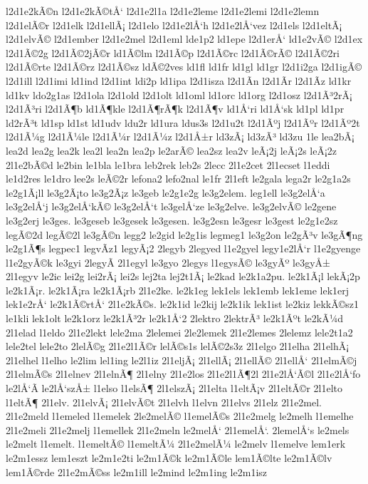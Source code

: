 {l2d1e2kÃ©n
l2d1e2kÃ©tÅ‘
l2d1e2l1a
l2d1e2leme
l2d1e2lemi
l2d1e2lemn
l2d1elÃ©r
l2d1elk
l2d1ellÃ¡
l2d1elo
l2d1e2lÅ‘h
l2d1e2lÅ‘vez
l2d1els
l2d1eltÃ¡
l2d1elvÃ©
l2d1ember
l2d1e2mel
l2d1eml
lde1p2
ld1epe
l2d1erÅ‘
ld1e2vÃ©
l2d1ex
l2d1Ã©2g
l2d1Ã©2jÃ©r
ld1Ã©lm
l2d1Ã©p
l2d1Ã©rc
l2d1Ã©rÃ©
l2d1Ã©2ri
l2d1Ã©rte
l2d1Ã©rz
l2d1Ã©sz
ldÃ©2ves
ld1fl
ld1fr
ld1gl
ld1gr
l2d1i2ga
l2d1igÃ©
l2d1ill
l2d1imi
ld1ind
l2d1int
ldi2p
ld1ipa
l2d1isza
l2d1Ã­n
l2d1Ã­r
l2d1Ã­z
ld1kr
ld1kv
ldo2g1as
l2d1ola
l2d1old
l2d1olt
ld1oml
ld1orc
ld1org
l2d1osz
l2d1Ã³2rÃ¡
l2d1Ã³ri
l2d1Ã¶b
ld1Ã¶kle
l2d1Ã¶rÃ¶k
l2d1Ã¶v
ld1Å‘ri
ld1Å‘sk
ld1pl
ld1pr
ld2rÃ³t
ld1sp
ld1st
ld1udv
ldu2r
ld1ura
ldus3s
l2d1u2t
l2d1Ãºj
l2d1Ãºr
l2d1Ãº2t
l2d1Ã¼g
l2d1Ã¼le
l2d1Ã¼r
l2d1Ã¼z
l2d1Å±r
ld3zÃ¡
ld3zÃ³
ld3zu
1le
lea2bÃ¡
lea2d
lea2g
lea2k
lea2l
lea2n
lea2p
le2arÃ©
lea2sz
lea2v
leÃ¡2j
leÃ¡2s
leÃ¡2z
2l1e2bÃ©d
le2bin
le1bla
le1bra
leb2rek
leb2s
2lecc
2l1e2cet
2l1ecset
l1eddi
le1d2res
le1dro
lee2s
leÃ©2r
lefona2
lefo2nal
le1fr
2l1eft
le2gala
lega2r
le2g1a2s
le2g1Ã¡ll
le3g2Ã¡to
le3g2Ã¡z
le3geb
le2g1e2g
le3g2elem.
leg1ell
le3g2elÅ‘a
le3g2elÅ‘j
le3g2elÅ‘kÃ©
le3g2elÅ‘t
le3gelÅ‘ze
le3g2elve.
le3g2elvÃ©
le2gene
le3g2erj
le3ges.
le3geseb
le3gesek
le3gesen.
le3g2esn
le3gesr
le3gest
le2g1e2sz
legÃ©2d
legÃ©2l
le3gÃ©n
legg2
le2gid
le2g1is
legmeg1
le3g2on
le2gÃ³v
le3gÃ¶ng
le2g1Ã¶s
legpec1
legvÃ­z1
legyÃ¡2
2legyb
2legyed
l1e2gyel
legy1e2lÅ‘r
l1e2gyenge
l1e2gyÃ©k
le3gyi
2legyÃ­
2l1egyl
le3gyo
2legys
l1egysÃ©
le3gyÃº
le3gyÅ±
2l1egyv
le2ic
lei2g
lei2rÃ¡
lei2s
lej2ta
lej2t1Ã¡
le2kad
le2k1a2pu.
le2k1Ã¡l
lekÃ¡2p
le2k1Ã¡r.
le2k1Ã¡ra
le2k1Ã¡rb
2l1e2ke.
le2k1eg
lek1els
lek1emb
lek1eme
lek1erj
lek1e2rÅ‘
le2k1Ã©rtÅ‘
2l1e2kÃ©s.
le2k1id
le2kij
le2k1ik
lek1ist
le2kiz
lekkÃ©sz1
le1kli
lek1olt
le2k1orz
le2k1Ã³2r
le2k1Å‘2
2lektro
2lektrÃ³
le2k1Ãºt
le2kÃ¼d
2l1elad
l1eldo
2l1e2lekt
lele2ma
2lelemei
2le2lemek
2l1e2lemes
2lelemz
lele2t1a2
lele2tel
lele2to
2lelÃ©g
2l1e2l1Ã©r
lelÃ©s1s
lelÃ©2s3z
2l1elgo
2l1elha
2l1elhÃ¡
2l1elhel
l1elho
le2lim
lel1ing
le2l1iz
2l1eljÃ¡
2l1ellÃ¡
2l1ellÃ©
2l1ellÅ‘
2l1elmÃ©j
2l1elmÃ©s
2l1elnev
2l1elnÃ¶
2l1elny
2l1e2los
2l1e2l1Ã¶2l
2l1e2lÅ‘Ã©l
2l1e2lÅ‘fo
le2lÅ‘Ã­
le2lÅ‘szÅ±
l1elso
l1elsÃ¶
2l1elszÃ¡
2l1elta
l1eltÃ¡v
2l1eltÃ©r
2l1elto
l1eltÃ¶
2l1elv.
2l1elvÃ¡
2l1elvÃ©t
2l1elvh
l1elvn
2l1elvs
2l1elz
2l1e2mel.
2l1e2meld
l1emeled
l1emelek
2le2melÃ©
l1emelÃ©s
2l1e2melg
le2melh
l1emelhe
2l1e2meli
2l1e2melj
l1emellek
2l1e2meln
le2melÅ‘
2l1emelÅ‘.
2lemelÅ‘s
le2mels
le2melt
l1emelt.
l1emeltÃ©
l1emeltÃ¼
2l1e2melÃ¼
le2melv
l1emelve
lem1erk
le2m1essz
lem1eszt
le2m1e2ti
le2m1Ã©k
le2m1Ã©le
lem1Ã©lte
le2m1Ã©lv
lem1Ã©rde
2l1e2mÃ©ss
le2m1ill
le2mind
le2m1ing
le2m1isz
}
